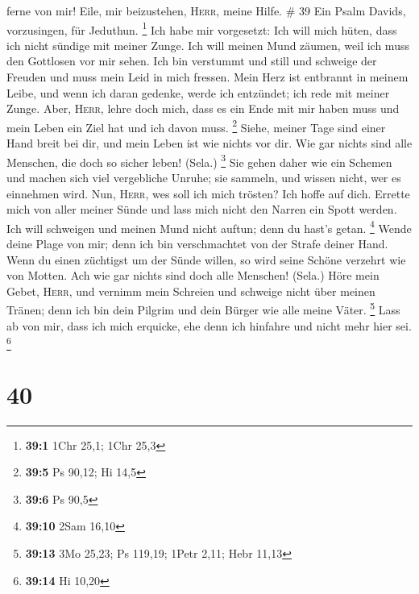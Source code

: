 ferne von mir!  Eile, mir beizustehen, \textsc{Herr},
meine Hilfe. \# 39  Ein Psalm Davids, vorzusingen, für
Jeduthun. \footnote{\textbf{39:1} 1Chr 25,1; 1Chr 25,3} 
Ich habe mir vorgesetzt: Ich will mich hüten, dass ich nicht sündige mit
meiner Zunge. Ich will meinen Mund zäumen, weil ich muss den Gottlosen
vor mir sehen.  Ich bin verstummt und still und schweige
der Freuden und muss mein Leid in mich fressen.  Mein Herz
ist entbrannt in meinem Leibe, und wenn ich daran gedenke, werde ich
entzündet; ich rede mit meiner Zunge.  Aber,
\textsc{Herr}, lehre doch mich, dass es ein Ende mit mir haben muss und
mein Leben ein Ziel hat und ich davon muss. \footnote{\textbf{39:5} Ps
  90,12; Hi 14,5}  Siehe, meiner Tage sind einer Hand
breit bei dir, und mein Leben ist wie nichts vor dir. Wie gar nichts
sind alle Menschen, die doch so sicher leben! (Sela.) \footnote{\textbf{39:6}
  Ps 90,5}  Sie gehen daher wie ein Schemen und machen
sich viel vergebliche Unruhe; sie sammeln, und wissen nicht, wer es
einnehmen wird.  Nun, \textsc{Herr}, wes soll ich mich
trösten? Ich hoffe auf dich.  Errette mich von aller
meiner Sünde und lass mich nicht den Narren ein Spott werden.
 Ich will schweigen und meinen Mund nicht auftun; denn du
hast's getan. \footnote{\textbf{39:10} 2Sam 16,10}  Wende
deine Plage von mir; denn ich bin verschmachtet von der Strafe deiner
Hand.  Wenn du einen züchtigst um der Sünde willen, so
wird seine Schöne verzehrt wie von Motten. Ach wie gar nichts sind doch
alle Menschen! (Sela.)  Höre mein Gebet, \textsc{Herr},
und vernimm mein Schreien und schweige nicht über meinen Tränen; denn
ich bin dein Pilgrim und dein Bürger wie alle meine Väter. \footnote{\textbf{39:13}
  3Mo 25,23; Ps 119,19; 1Petr 2,11; Hebr 11,13}  Lass ab
von mir, dass ich mich erquicke, ehe denn ich hinfahre und nicht mehr
hier sei. \footnote{\textbf{39:14} Hi 10,20}

\hypertarget{section-17}{%
\section{40}\label{section-17}}

